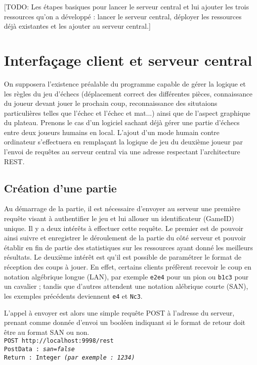 \documentclass[a4paper,11pt]{report}
\begin{document}
[TODO: Les étapes basiques pour lancer le serveur central et lui ajouter les trois ressources qu'on a développé : lancer le serveur central, déployer les ressources déjà existantes et les ajouter au serveur central.]



\chapter{Interfaçage client et serveur central}
        On supposera l'existence préalable du programme capable de gérer la logique et les règles du jeu d'échecs (déplacement correct des différentes pièces, connaissance du joueur devant jouer le prochain coup, reconnaissance des situtaions particulières telles que l'échec et l'échec et mat...) ainsi que de l'aspect graphique du plateau. Prenons le cas d'un logiciel sachant déjà gérer une partie d'échecs entre deux joueurs humains en local. L'ajout d'un mode humain contre ordinateur s'effectuera en remplaçant la logique de jeu du deuxième joueur par l'envoi de requêtes au serveur central via une adresse respectant l’architecture REST. 


\section{Création d’une partie}
        Au démarrage de la partie, il est nécessaire d’envoyer au serveur une première requête visant à authentifier le jeu et lui allouer un identificateur (GameID) unique. Il y a deux intérêts à effectuer cette requête. Le premier est de pouvoir ainsi suivre et enregistrer le déroulement de la partie du côté serveur et pouvoir établir en fin de partie des statistiques sur les ressources ayant donné les meilleurs résultats. Le deuxième intérêt est qu’il est possible de paramétrer le format de réception des coups à jouer. En effet, certains clients préfèrent recevoir le coup en notation algébrique longue (LAN), par exemple {\tt e2e4} pour un pion ou {\tt b1c3} pour un cavalier ; tandis que d’autres attendent une notation alébrique courte (SAN), les exemples précédents deviennent {\tt e4} et {\tt Nc3}.


        L’appel à envoyer est alors une simple requête POST à l’adresse du serveur, prenant comme donnée d’envoi un booléen indiquant si le format de retour doit être au format SAN ou non.
\\{\tt POST http://localhost:9998/rest\\
PostData : {\em san=false}\\
Return : Integer {\em (par exemple : 1234)} }\\
\end{document}
